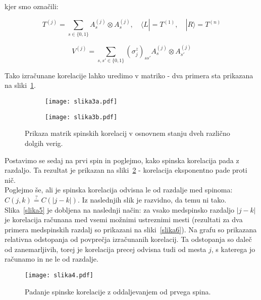\documentclass[a4paper]{article}
\newcommand{\bra}[1]{\langle#1|}
\newcommand{\ket}[1]{|#1\rangle}
\newcommand{\s}{\sigma}
\begin{document}
    kjer smo označili:

    \begin{equation}\label{eq5}
        T^{(j)} = \sum_{s \in \{0, 1\}} A_s^{(j)} \otimes A_s^{(j)}, \quad
        \bra{L} = T^{(1)}, \quad
        \ket{R} = T^{(n)}
    \end{equation}

    \begin{equation}\label{eq6}
        V^{(j)} = \sum_{s, s' \in \{0, 1\}} (\s^z_j)_{ss'}  A_s^{(j)} \otimes A_{s'}^{(j)}
    \end{equation}

    Tako izračunane korelacije lahko uredimo v matriko - dva primera sta prikazana na sliki~\ref{slika3}.

    \begin{figure}
        \centering
        \begin{subfigure}{\textwidth}
            \texttt{[image: slika3a.pdf]}
        \end{subfigure}
        \begin{subfigure}{\textwidth}
            \texttt{[image: slika3b.pdf]}
        \end{subfigure}
        \caption{Prikaza matrik spinskih korelacij v osnovnem stanju dveh različno dolgih verig.}
        \label{slika3}
    \end{figure}

    Postavimo se sedaj na prvi spin in poglejmo, kako spinska korelacija pada z razdaljo. Ta rezultat je prikazan na sliki~\ref{slika4} - korelacija
    eksponentno pade proti nič.\\
    Poglejmo še, ali je spinska korelacija odvisna le od razdalje med spinoma: $C(j, k) \stackrel{?}{=} C(|j - k|)$. Iz naslednjih slik je razvidno,
    da temu ni tako. Slika~\ref{slika5} je dobljena na naslednji način: za vsako medspinsko razdaljo $|j - k|$ je korelacija računana med vsemi
    možnimi ustreznimi mesti (rezultati za dva primera medspinskih razdalj so prikazani na sliki~\ref{slika6}).
    Na grafu so prikazana relativna odstopanja od povprečja izračunanih korelacij. Ta odstopanja so daleč od zanemarljivih,
    torej je korelacija precej odvisna tudi od mesta $j$, s katerega jo računamo in ne le od razdalje.

    \begin{figure}
        \centering
        \texttt{[image: slika4.pdf]}
        \caption{Padanje spinske korelacije z oddaljevanjem od prvega spina.}
        \label{slika4}
    \end{figure}
\end{document}

